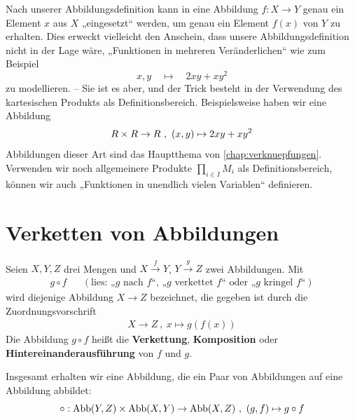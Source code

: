 \begin{bem}
    Nach unserer Abbildungsdefinition kann in eine Abbildung $f:X\to Y$ genau ein Element $x$ aus $X$ „eingesetzt“ werden, um genau ein Element $f(x)$ von $Y$ zu erhalten. Dies erweckt vielleicht den Anschein, dass unsere Abbildungsdefinition nicht in der Lage wäre, „Funktionen in mehreren Veränderlichen“ wie zum Beispiel
        \[ x,y \quad\mapsto\quad 2xy + xy^2 \]
    zu modellieren. -- Sie ist es aber, und der Trick besteht in der Verwendung des kartesischen Produkts als Definitionsbereich. Beispielsweise haben wir eine Abbildung
        \[ \relax R \times \relax R \to \relax R \ ,\ (x,y) \mapsto 2xy +xy^2 \]
    Abbildungen dieser Art sind das Hauptthema von \cref{chap:verknuepfungen}. Verwenden wir noch allgemeinere Produkte $\prod_{i\in I} M_i$ als Definitionsbereich, können wir auch „Funktionen in unendlich vielen Variablen“ definieren.
\end{bem}





\section{Verketten von Abbildungen}


\begin{defin}\label{def:verkettung} 
    Seien $X,Y,Z$ drei Mengen und $X\xrightarrow{f} Y$, $Y \xrightarrow{g} Z$ zwei Abbildungen. Mit
    \begin{align*}
        g\circ f && (\text{lies: „$g$ nach $f$“, „$g$ verkettet $f$“ oder „$g$ kringel $f$“})
    \end{align*}
    wird diejenige Abbildung $X\to Z$ bezeichnet, die gegeben ist durch die Zuordnungsvorschrift
    \begin{align*}
        X \to Z \ ,\ x \mapsto g(f(x))
    \end{align*}
    Die Abbildung $g\circ f$ heißt die \textbf{Verkettung}, \textbf{Komposition} oder \textbf{Hintereinanderausführung} von $f$ und $g$.
    
    Insgesamt erhalten wir eine Abbildung, die ein Paar von Abbildungen auf eine Abbildung abbildet:
        \[ \circ : \operatorname{Abb}(Y,Z)\times \operatorname{Abb}(X,Y) \to \operatorname{Abb}(X,Z) \ ,\ (g,f) \mapsto g\circ f\]
\end{defin}


